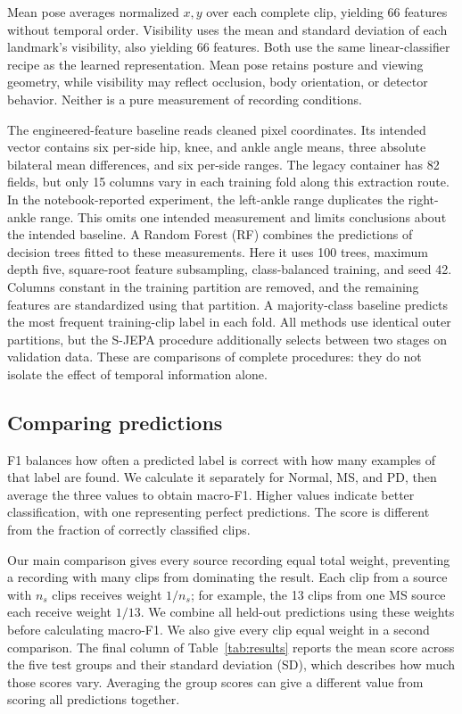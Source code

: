 \documentclass[10pt,twocolumn,letterpaper]{article}
\begin{document}
Mean pose averages normalized $x,y$ over each complete clip, yielding 66 features without temporal order. Visibility uses the mean and standard deviation of each landmark's visibility, also yielding 66 features. Both use the same linear-classifier recipe as the learned representation. Mean pose retains posture and viewing geometry, while visibility may reflect occlusion, body orientation, or detector behavior. Neither is a pure measurement of recording conditions.

The engineered-feature baseline reads cleaned pixel coordinates. Its intended vector contains six per-side hip, knee, and ankle angle means, three absolute bilateral mean differences, and six per-side ranges. The legacy container has 82 fields, but only 15 columns vary in each training fold along this extraction route. In the notebook-reported experiment, the left-ankle range duplicates the right-ankle range. This omits one intended measurement and limits conclusions about the intended baseline. A Random Forest (RF) combines the predictions of decision trees fitted to these measurements. Here it uses 100 trees, maximum depth five, square-root feature subsampling, class-balanced training, and seed 42. Columns constant in the training partition are removed, and the remaining features are standardized using that partition. A majority-class baseline predicts the most frequent training-clip label in each fold. All methods use identical outer partitions, but the S-JEPA procedure additionally selects between two stages on validation data. These are comparisons of complete procedures: they do not isolate the effect of temporal information alone.

\subsection{Comparing predictions}
F1 balances how often a predicted label is correct with how many examples of that label are found. We calculate it separately for Normal, MS, and PD, then average the three values to obtain macro-F1. Higher values indicate better classification, with one representing perfect predictions. The score is different from the fraction of correctly classified clips.

Our main comparison gives every source recording equal total weight, preventing a recording with many clips from dominating the result. Each clip from a source with $n_s$ clips receives weight $1/n_s$; for example, the 13 clips from one MS source each receive weight $1/13$. We combine all held-out predictions using these weights before calculating macro-F1. We also give every clip equal weight in a second comparison. The final column of Table~\ref{tab:results} reports the mean score across the five test groups and their standard deviation (SD), which describes how much those scores vary. Averaging the group scores can give a different value from scoring all predictions together.
\end{document}
